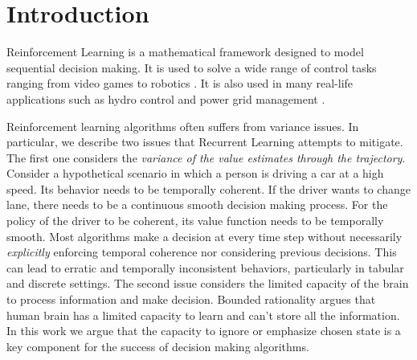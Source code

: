 \section{Introduction}
Reinforcement Learning is a mathematical framework designed to model sequential decision making. It is used to solve a wide range of control tasks ranging from video games \cite{vinyals2017starcraft,mnih2013playing,mnih2016asynchronous} to robotics \cite{kober2013reinforcement,abbeel2010autonomous}. It is also used in many real-life applications such as hydro control \cite{grinberg2014optimizing} and power grid management \cite{franccois2016deep}.

Reinforcement learning algorithms often suffers from variance issues. In particular, we describe two issues that Recurrent Learning attempts to mitigate. The first one considers the \emph{variance of the value estimates through the trajectory}. Consider a hypothetical scenario in which a person is driving a car at a high speed. Its behavior needs to be temporally coherent. If the driver wants to change lane, there needs to be a continuous smooth decision making process. For the policy of the driver to be coherent, its value function needs to be temporally smooth. Most algorithms make a decision at every time step without necessarily \emph{explicitly} enforcing temporal coherence nor considering previous decisions. This can lead to erratic and temporally inconsistent behaviors, particularly in tabular and discrete settings. The second issue considers the limited capacity of the brain to process information and make decision. Bounded rationality argues that human brain has a limited capacity to learn and can't store all the information. In this work we argue that the capacity to ignore or emphasize chosen state is a key component for the success of decision making algorithms.  